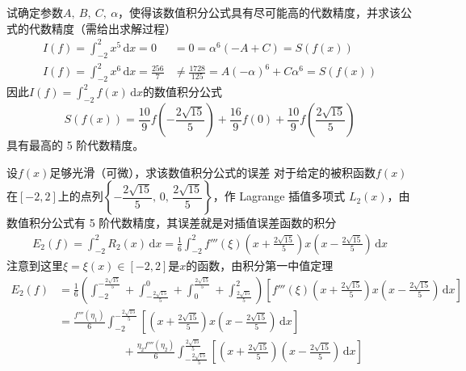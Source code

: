 \documentclass[11pt]{article}
\begin{document}
\begin{question}
\begin{subquestion}{试确定参数$A,\ B,\ C,\ \alpha$，使得该数值积分公式具有尽可能高的代数精度，并求该公式的代数精度（需给出求解过程）}
{\begin{align*}
            I(f) = \int_{-2}^{2}\!{x^5\,\text{d}x} = 0             & =0= \alpha^6(-A + C) = S\left(f(x)\right)                             \\
            I(f) = \int_{-2}^{2}\!{x^6\,\text{d}x} = \frac{256}{7} & \neq \frac{1728}{125} = A(-\alpha)^6 + C\alpha^6 = S\left(f(x)\right)
        \end{align*}
        因此$I(f) = \displaystyle \int_{-2}^{2}\!{f(x)\,\text{d}x}$的数值积分公式
        \begin{equation*}
            S\left(f(x)\right) = \frac{10}{9}f\left(-\frac{2\sqrt{15}}{5}\right) + \frac{16}{9}f(0) + \frac{10}{9}f\left(\frac{2\sqrt{15}}{5}\right)
        \end{equation*}
        具有最高的 5 阶代数精度。
        }
    \end{subquestion}
    \begin{subquestion}{设$f(x)$足够光滑（可微），求该数值积分公式的误差}
        \answer
        {
            对于给定的被积函数$f(x)$在$[-2, 2]$上的点列$\left\{-\dfrac{2\sqrt{15}}{5},\, 0,\, \dfrac{2\sqrt{15}}{5}\right\}$，作 Lagrange 插值多项式 $L_2(x)$，由数值积分公式有 5 阶代数精度，其误差就是对插值误差函数的积分
            \begin{align*}
                E_2(f) = \int_{-2}^{2}\!{R_2(x)\,\text{d}x} = \frac{1}{6}\int_{-2}^{2}\!{f'''(\xi)\left(x + \frac{2\sqrt{15}}{5}\right)x\left(x - \frac{2\sqrt{15}}{5}\right)\,\text{d}x}
            \end{align*}
            注意到这里$\xi = \xi(x) \in [-2, 2]$是$x$的函数，由积分第一中值定理
            \begin{align*}
                E_2(f) & = \frac{1}{6}\left(\int_{-2}^{-\frac{2\sqrt{15}}{5}}\! + \int_{-\frac{2\sqrt{15}}{5}}^{0}\! + \int_{0}^{\frac{2\sqrt{15}}{5}}\! + \int_{\frac{2\sqrt{15}}{5}}^{2}\!\right){\left[f'''(\xi)\left(x + \frac{2\sqrt{15}}{5}\right)x\left(x - \frac{2\sqrt{15}}{5}\right)\,\text{d}x\right]} \\
                       & = \frac{f'''(\eta_1)}{6}\int_{-2}^{-\frac{2\sqrt{15}}{5}}\!{\left[\left(x + \frac{2\sqrt{15}}{5}\right)x\left(x - \frac{2\sqrt{15}}{5}\right)\,\text{d}x\right]}                                                                                                                         \\
                       & \phantom{1+1+1+1} +\frac{\eta_2f'''(\eta_2)}{6}\int_{-\frac{2\sqrt{15}}{5}}^{\frac{2\sqrt{15}}{5}}\!{\left[\left(x + \frac{2\sqrt{15}}{5}\right)\left(x - \frac{2\sqrt{15}}{5}\right)\,\text{d}x\right]}                                                                                 \\

\end{align*}}
\end{subquestion}
\end{question}
\end{document}
